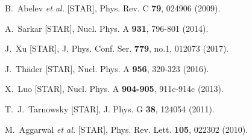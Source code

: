 
\begin{thebibliography}{99}


B.~Abelev \textit{et al.} [STAR],
Phys. Rev. C \textbf{79}, 024906 (2009).

A.~Sarkar [STAR],
Nucl. Phys. A \textbf{931}, 796-801 (2014).

J.~Xu [STAR],
J. Phys. Conf. Ser. \textbf{779}, no.1, 012073 (2017).

J.~Thäder [STAR],
Nucl. Phys. A \textbf{956}, 320-323 (2016).

X.~Luo [STAR],
Nucl. Phys. A \textbf{904-905}, 911c-914c (2013).

T.~J.~Tarnowsky [STAR],
J. Phys. G \textbf{38}, 124054 (2011).

M.~Aggarwal \textit{et al.} [STAR],
Phys. Rev. Lett. \textbf{105}, 022302 (2010).


\end{thebibliography}
